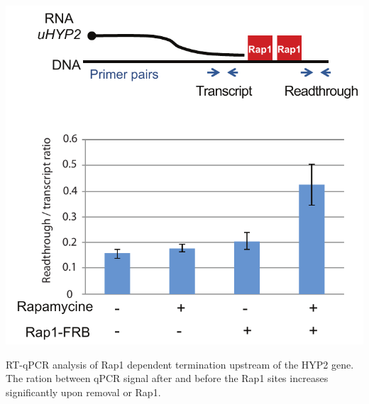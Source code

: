 \begin{suppfigure}[h!]

\centering
\includegraphics[width=\textwidth]{figures/results/rap/S10.pdf}
\caption[]{RT-qPCR analysis of Rap1 dependent termination upstream of the HYP2 gene. The ration between qPCR signal after and before the Rap1 sites increases significantly upon removal or Rap1.} 
\label{fig:S10}

\end{suppfigure}

\clearpage
